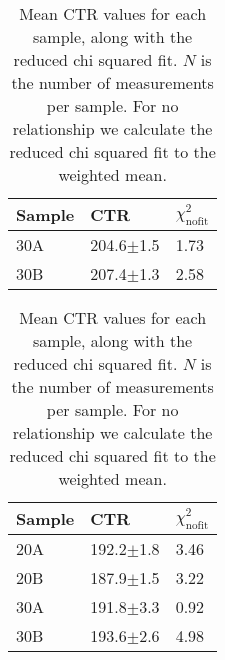 \begin{table}
\caption{Mean CTR values for each sample, along with the reduced chi squared fit. $N$ is the number of measurements per sample. For no relationship we calculate the reduced chi squared fit to the weighted mean.}
\label{tab:doiresults-ProteusUnwrapped}
\begin{tabular}{lll}
\toprule
Sample &            CTR &   $\chi^2_\text{nofit}$ \\
\midrule
   30A &  204.6$\pm$1.5 &  1.73 \\
   30B &  207.4$\pm$1.3 &  2.58 \\
\bottomrule
\end{tabular}
\end{table}

\begin{table}[H]
\caption{Mean CTR values for each sample, along with the reduced chi squared fit. $N$ is the number of measurements per sample. For no relationship we calculate the reduced chi squared fit to the weighted mean.}
\label{tab:doiresults}
\begin{tabular}{lll}
\toprule
Sample &            CTR &   $\chi^2_\text{nofit}$ \\
\midrule
   20A &  192.2$\pm$1.8 &  3.46 \\
   20B &  187.9$\pm$1.5 &  3.22 \\
   30A &  191.8$\pm$3.3 &  0.92 \\
   30B &  193.6$\pm$2.6 &  4.98 \\
\bottomrule
\end{tabular}
\end{table}